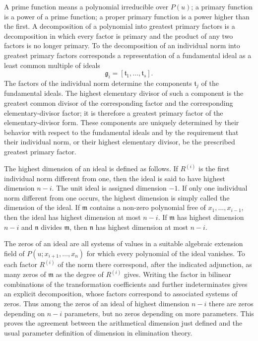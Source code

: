 \documentclass[12pt]{article}
\begin{document}
A prime function means a polynomial irreducible over $P(u)$; a primary function is a power of a prime function; a proper primary function is a power higher than the first. A decomposition of a polynomial into greatest primary factors is a decomposition in which every factor is primary and the product of any two factors is no longer primary. To the decomposition of an individual norm into greatest primary factors corresponds a representation of a fundamental ideal as a least common multiple of ideals
\[
  \mathfrak g_i=[\mathfrak t_1,\ldots,\mathfrak t_s].
\]
The factors of the individual norm determine the components $\mathfrak t_j$ of the fundamental ideals. The highest elementary divisor of such a component is the greatest common divisor of the corresponding factor and the corresponding elementary-divisor factor; it is therefore a greatest primary factor of the elementary-divisor form. These components are uniquely determined by their behavior with respect to the fundamental ideals and by the requirement that their individual norm, or their highest elementary divisor, be the prescribed greatest primary factor.

The highest dimension of an ideal is defined as follows. If $R^{(i)}$ is the first individual norm different from one, then the ideal is said to have highest dimension $n-i$. The unit ideal is assigned dimension $-1$. If only one individual norm different from one occurs, the highest dimension is simply called the dimension of the ideal. If $\mathfrak m$ contains a non-zero polynomial free of $x_1,\ldots,x_{i-1}$, then the ideal has highest dimension at most $n-i$. If $\mathfrak m$ has highest dimension $n-i$ and $\mathfrak n$ divides $\mathfrak m$, then $\mathfrak n$ has highest dimension at most $n-i$.

The zeros of an ideal are all systems of values in a suitable algebraic extension field of $P(u;x_{i+1},\ldots,x_n)$ for which every polynomial of the ideal vanishes. To each factor $R^{(i)}$ of the norm there correspond, after the indicated adjunction, as many zeros of $\mathfrak m$ as the degree of $R^{(i)}$ gives. Writing the factor in bilinear combinations of the transformation coefficients and further indeterminates gives an explicit decomposition, whose factors correspond to associated systems of zeros. Thus among the zeros of an ideal of highest dimension $n-i$ there are zeros depending on $n-i$ parameters, but no zeros depending on more parameters. This proves the agreement between the arithmetical dimension just defined and the usual parameter definition of dimension in elimination theory.
\end{document}
